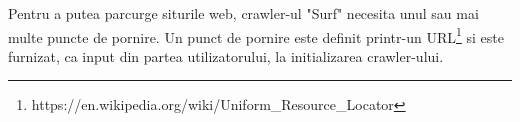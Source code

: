 Pentru a putea parcurge siturile web, crawler-ul "Surf" necesita unul sau mai multe puncte de pornire. Un punct de pornire este definit printr-un URL\footnote{https://en.wikipedia.org/wiki/Uniform\_Resource\_Locator} si este furnizat, ca input din partea utilizatorului, la initializarea crawler-ului.